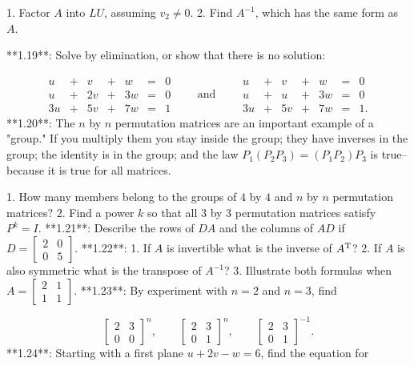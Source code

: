 1. Factor \(A\) into \(LU\), assuming \(v_{2}\neq 0\). 2. Find \(A^{-1}\), which has the same form as \(A\).

**1.19**: Solve by elimination, or show that there is no solution:

\[\begin{array}{ccccccccc}u&+&v&+&w&=&0\\ u&+&2v&+&3w&=&0\\ 3u&+&5v&+&7w&=&1\end{array}\qquad\mbox{and}\qquad\begin{array}{ccccccccc}u&+&v&+&w&=&0\\ u&+&u&+&3w&=&0\\ 3u&+&5v&+&7w&=&1.\end{array}\]
**1.20**: The \(n\) by \(n\) permutation matrices are an important example of a "group." If you multiply them you stay inside the group; they have inverses in the group; the identity is in the group; and the law \(P_{1}(P_{2}P_{3})=(P_{1}P_{2})P_{3}\) is true--because it is true for all matrices.

1. How many members belong to the groups of \(4\) by \(4\) and \(n\) by \(n\) permutation matrices? 2. Find a power \(k\) so that all \(3\) by \(3\) permutation matrices satisfy \(P^{k}=I\).
**1.21**: Describe the rows of \(DA\) and the columns of \(AD\) if \(D=[\begin{smallmatrix}2&0\\ 0&5\end{smallmatrix}]\).
**1.22**: 1. If \(A\) is invertible what is the inverse of \(A^{\rm T}\)? 2. If \(A\) is also symmetric what is the transpose of \(A^{-1}\)? 3. Illustrate both formulas when \(A=[\begin{smallmatrix}2&1\\ 1&1\end{smallmatrix}]\).
**1.23**: By experiment with \(n=2\) and \(n=3\), find

\[\begin{bmatrix}2&3\\ 0&0\end{bmatrix}^{n},\qquad\begin{bmatrix}2&3\\ 0&1\end{bmatrix}^{n},\qquad\begin{bmatrix}2&3\\ 0&1\end{bmatrix}^{-1}.\]
**1.24**: Starting with a first plane \(u+2v-w=6\), find the equation for

